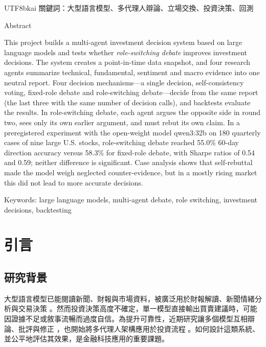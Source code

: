 \documentclass[12pt,a4paper]{article}
\begin{document}
\begin{CJK}{UTF8}{bkai}
\vspace{0.6cm}
\noindent 關鍵詞：大型語言模型、多代理人辯論、立場交換、投資決策、回測

\clearpage
\begin{center}
{\fontsize{16}{24}\selectfont Abstract\par}
\end{center}
\vspace{0.3cm}

\noindent This project builds a multi-agent investment decision system based on large language models and tests whether \emph{role-switching debate} improves investment decisions. The system creates a point-in-time data snapshot, and four research agents summarize technical, fundamental, sentiment and macro evidence into one neutral report. Four decision mechanisms---a single decision, self-consistency voting, fixed-role debate and role-switching debate---decide from the same report (the last three with the same number of decision calls), and backtests evaluate the results. In role-switching debate, each agent argues the opposite side in round two, sees only its own earlier argument, and must rebut its own claim. In a preregistered experiment with the open-weight model qwen3:32b on 180 quarterly cases of nine large U.S. stocks, role-switching debate reached 55.0\% 60-day direction accuracy versus 58.3\% for fixed-role debate, with Sharpe ratios of 0.54 and 0.59; neither difference is significant. Case analysis shows that self-rebuttal made the model weigh neglected counter-evidence, but in a mostly rising market this did not lead to more accurate decisions.

\vspace{0.6cm}
\noindent Keywords: large language models, multi-agent debate, role switching, investment decisions, backtesting

\clearpage
{}

\section{引言}

\subsection{研究背景}

大型語言模型已能閱讀新聞、財報與市場資料，被廣泛用於財報解讀、新聞情緒分析與交易決策 \citep{lopezlira2023chatgpt,araci2019finbert,liu2023fingpt}。然而投資決策高度不確定，單一模型直接輸出買賣建議時，可能因證據不足或敘事流暢而過度自信。為提升可靠性，近期研究讓多個模型互相辯論、批評與修正 \citep{du2023debate,liang2023divergent}，也開始將多代理人架構應用於投資流程 \citep{xiao2024tradingagents,zhang2024stockagent}。如何設計這類系統、並公平地評估其效果，是金融科技應用的重要課題。


\end{CJK}
\end{document}

